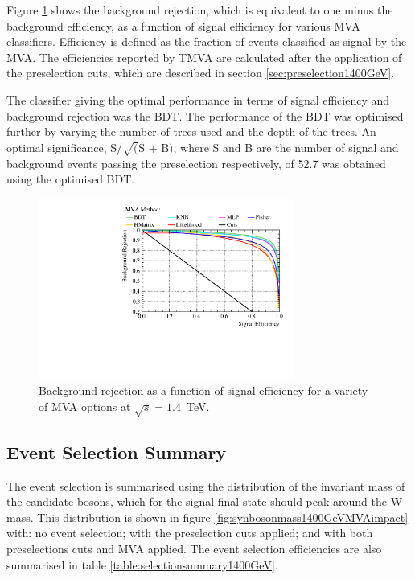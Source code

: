 Figure \ref{fig:mvaalternatives1400GeV} shows the background rejection, which is equivalent to one minus the background efficiency, as a function of signal efficiency for various MVA classifiers.  Efficiency is defined as the fraction of events classified as signal by the MVA.  The efficiencies reported by TMVA are calculated after the application of the preselection cuts, which are described in section \ref{sec:preselection1400GeV}.  

The classifier giving the optimal performance in terms of signal efficiency and background rejection was the BDT.  The performance of the BDT was optimised further by varying the number of trees used and the depth of the trees.  An optimal significance, S/$\sqrt(\text{S + B})$, where S and B are the number of signal and background events passing the preselection respectively, of 52.7 was obtained using the optimised BDT. 

\begin{figure}
\centering
\includegraphics[width=0.75\textwidth]{PhysicsAnalysis/Plots/MVAPlots/1400GeV/ThesisPlotMVAAlternatives1400GeV.pdf}
\caption[Background rejection as a function of signal efficiency for a variety of MVA options at $\sqrt{s}=1.4$~TeV.]{Background rejection as a function of signal efficiency for a variety of MVA options at $\sqrt{s}=1.4$~TeV.} 
\label{fig:mvaalternatives1400GeV}
\end{figure}


\subsection{Event Selection Summary}
\label{sec:eventselsummary1400GeV}
The event selection is summarised using the distribution of the invariant mass of the candidate bosons, which for the signal final state should peak around the W mass.  This distribution is shown in figure \ref{fig:synbosonmass1400GeVMVAimpact} with: no event selection; with the preselection cuts applied; and with both preselections cuts and MVA applied.  The event selection efficiencies are also summarised in table \ref{table:selectionsummary1400GeV}.


